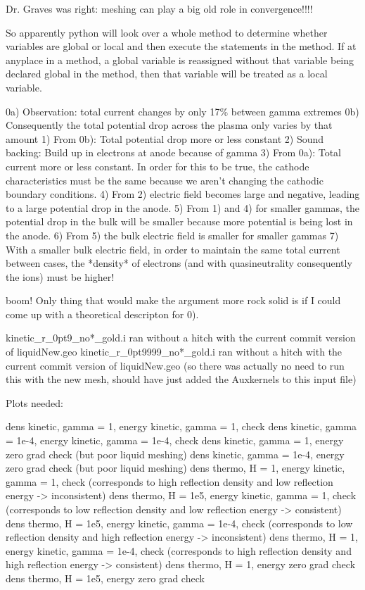 {Dr. Graves was right: meshing can play a big old role in convergence!!!!

So apparently python will look over a whole method to determine whether variables are global or local and then execute the statements in the method. If at anyplace in a method, a global variable is reassigned without that variable being declared global in the method, then that variable will be treated as a local variable.

0a) Observation: total current changes by only 17\% between gamma extremes
0b) Consequently the total potential drop across the plasma only varies by that amount
1) From 0b): Total potential drop more or less constant
2) Sound backing: Build up in electrons at anode because of gamma
3) From 0a): Total current more or less constant. In order for this to be true, the cathode characteristics must be the same because we aren't changing the cathodic boundary conditions.
4) From 2) electric field becomes large and negative, leading to a large potential drop in the anode.
5) From 1) and 4) for smaller gammas, the potential drop in the bulk will be smaller because more potential is being lost in the anode.
6) From 5) the bulk electric field is smaller for smaller gammas
7) With a smaller bulk electric field, in order to maintain the same total current between cases, the *density* of electrons (and with quasineutrality consequently the ions) must be higher!

boom! Only thing that would make the argument more rock solid is if I could come up with a theoretical descripton for 0).

kinetic_r_0pt9_no*_gold.i ran without a hitch with the current commit version of liquidNew.geo
kinetic_r_0pt9999_no*_gold.i ran without a hitch with the current commit version of liquidNew.geo (so there was actually no need to run this with the new mesh, should have just added the Auxkernels to this input file)

Plots needed:

dens kinetic, gamma = 1, energy kinetic, gamma = 1, check
dens kinetic, gamma = 1e-4, energy kinetic, gamma = 1e-4, check
dens kinetic, gamma = 1, energy zero grad check (but poor liquid meshing)
dens kinetic, gamma = 1e-4, energy zero grad check (but poor liquid meshing)
dens thermo, H = 1, energy kinetic, gamma = 1, check (corresponds to high reflection density and low reflection energy -> inconsistent)
dens thermo, H = 1e5, energy kinetic, gamma = 1, check (corresponds to low reflection density and low reflection energy -> consistent)
dens thermo, H = 1e5, energy kinetic, gamma = 1e-4, check (corresponds to low reflection density and high reflection energy -> inconsistent)
dens thermo, H = 1, energy kinetic, gamma = 1e-4, check (corresponds to high reflection density and high reflection energy -> consistent)
dens thermo, H = 1, energy zero grad check
dens thermo, H = 1e5, energy zero grad check

}
